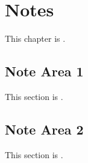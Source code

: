 
\chapter{Notes}
\label{loc:Notes}


This chapter is \TBD.

\section{Note Area 1}
\label{loc:Notes_1}


This section is \TBD.

\section{Note Area 2}
\label{loc:Notes_2}


This section is \TBD.


